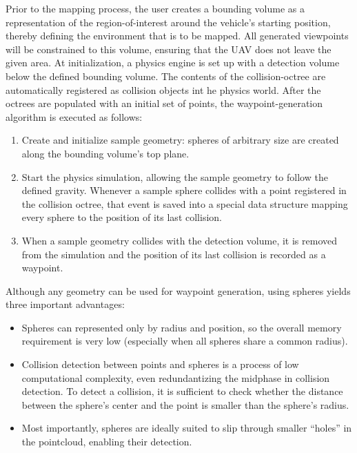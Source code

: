 \documentclass[a4paper, 10pt, conference]{ieeeconf}        %
\begin{document}
Prior to the mapping process, the user creates a bounding volume as a representation of the region-of-interest around the vehicle's starting position, thereby defining the environment that is to be mapped. All generated viewpoints will be constrained to this volume, ensuring that the UAV does not leave the given area. At initialization, a physics engine is set up with a detection volume below the defined bounding volume. The contents of the collision-octree are automatically registered as collision objects int he physics world. After the octrees are populated with an initial set of points, the waypoint-generation algorithm is executed as follows:

\begin{enumerate}
     \item Create and initialize sample geometry: spheres of arbitrary size are created along the bounding volume's top plane.
     \item Start the physics simulation, allowing the sample geometry to follow the defined gravity. Whenever a sample sphere collides with a point registered in the collision octree, that event is saved into a special data structure mapping every sphere to the position of its last collision.
     \item When a sample geometry collides with the detection volume, it is removed from the simulation and the position of its last collision is recorded as a waypoint.
\end{enumerate}

Although any geometry can be used for waypoint generation, using spheres yields three important advantages:
\begin{itemize}
  \item Spheres can represented only by radius and position, so the overall memory requirement is very low (especially when all spheres share a common radius).
  \item Collision detection between points and spheres is a process of low computational complexity, even redundantizing the midphase in collision detection. To detect a collision, it is sufficient to check whether the distance between the sphere's center and the point is smaller than the sphere's radius.
  \item Most importantly, spheres are ideally suited to slip through smaller ``holes'' in the pointcloud, enabling their detection.
\end{itemize}

\end{document}
